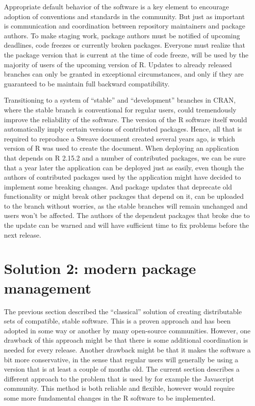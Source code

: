Appropriate default behavior of the software is a key element to encourage
adoption of conventions and standards in the community. But just as important is
communication and coordination between repository maintainers and package authors.
To make staging work, package authors must be notified of upcoming deadlines,
code freezes or currently broken packages. Everyone must realize that the
package version that is current at the time of code freeze, will be used by the
majority of users of the upcoming version of R. Updates to already released
branches can only be granted in exceptional circumstances, and only if they are
guaranteed to be maintain full backward compatibility.

Transitioning to a system of ``stable'' and ``development'' branches in CRAN,
where the stable branch is conventional for regular users, could tremendously
improve the reliability of the software. The version of the R software itself
would automatically imply certain versions of contributed packages. Hence, all
that is required to reproduce a Sweave document created several years ago, is
which version of R was used to create the document. When deploying an
application that depends on R 2.15.2 and a number of contributed packages, we can
be sure that a year later the application can be deployed just as easily, even
though the authors of contributed packages used by the application might have
decided to implement some breaking changes.
And package updates that deprecate old functionality or might break other
packages that depend on it, can be uploaded to the  branch
without worries, as the stable branches will remain unchanged and users won't
be affected. The authors of the dependent packages that broke due to the update
can be warned and will have sufficient time to fix problems before the next
 release.

\section{Solution 2: modern package management}


The previous section described the ``classical'' solution of creating distributable
sets of compatible, stable software. This is a proven approach and has been adopted in some way or
another by many open-source communities. However, one drawback of this approach
might be that there is some additional coordination is needed for every release.
Another drawback might be that it makes the software a bit more conservative,
in the sense that regular users will generally be using a version that is at
least a couple of months old. The current section describes a different approach
to the problem that is used by for example the Javascript community. This method
is both reliable and flexible, however would require some more fundamental changes
in the R software to be implemented.

